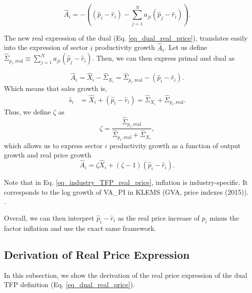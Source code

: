 \documentclass[11pt]{article}
\begin{document}
\begin{equation}
\label{eq_dual_real_price}
\hat{A}_i = - \left( (\hat{p}_i-\hat{r}_i) - \sum_{j=1}^N  a_{ji} (\hat{p}_j- \hat{r}_i) \right).
\end{equation}

The new real expression of the dual (Eq. \eqref{eq_dual_real_price}), translates easily into the expression of sector $i$ productivity growth $\hat{A}_i$. Let us define $\hat{\Sigma}_{p_i,\text{real}}\equiv \sum_{j=1}^N  a_{ji} (\hat{p}_j- \hat{r}_i)$. Then, we can then express primal and dual as

\begin{equation}
\hat{A}_i = \hat{X}_i - \hat{\Sigma}_{X_i} = \hat{\Sigma}_{p_i,\text{real}} - (\hat{p}_i-\hat{r}_i).
\label{eq:tfpq_def_SxSp}
\end{equation}
Which means that sales growth is,
\begin{align}
\hat{s}_i &= \hat{X}_i + (\hat{p}_i-\hat{r}_i) = \hat{\Sigma}_{X_i} + \hat{\Sigma}_{p_i,\text{real}}.
\label{eq:siSpSx}
\end{align}
Thus, we define $\zeta$ as 
\begin{equation}
\zeta = \frac{\hat{\Sigma}_{p_i,\text{real}}}{\hat{\Sigma}_{p_i,\text{real}} + \hat{\Sigma}_{X_i}},
\label{eq:zeta}
\end{equation}
which allows us to express sector $i$ productivity growth as a function of output growth and real price growth
\begin{equation}
\label{eq_industry_TFP_real_price}
    \hat{A}_i = \zeta \hat{X}_i + (\zeta - 1) (\hat{p}_i-\hat{r}_i).
\end{equation}


Note that in Eq. \eqref{eq_industry_TFP_real_price}, inflation is industry-specific. It corresponds to the log growth of VA\_PI in KLEMS  (GVA, price indexes (2015)). .

Overall, we can then interpret $\hat{p}_i-\hat{r}_i$ as the real price increase of $p_i$ minus the factor inflation and use the exact same framework.


\subsection{Derivation of Real Price Expression}
\label{subsect_derivation_dual_real_price}

In this subsection, we show the derivation of the real price expression of the dual TFP definition  (Eq. \eqref{eq_dual_real_price}).
\end{document}
